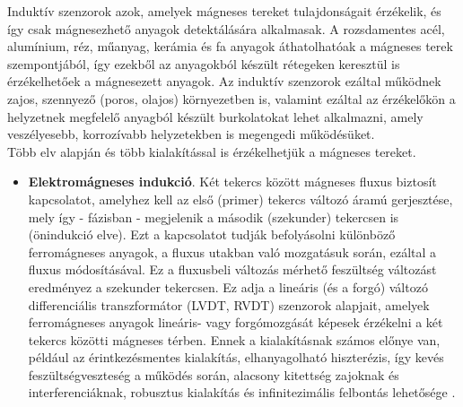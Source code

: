 Induktív szenzorok azok, amelyek mágneses tereket tulajdonságait érzékelik, és így csak mágnesezhető anyagok detektálására alkalmasak. A rozsdamentes acél, alumínium, réz, műanyag, kerámia és fa anyagok áthatolhatóak a mágneses terek szempontjából, így ezekből az anyagokból készült rétegeken keresztül is érzékelhetőek a mágnesezett anyagok. Az induktív szenzorok ezáltal működnek zajos, szennyező (poros, olajos) környezetben is, valamint ezáltal az érzékelőkön a helyzetnek megfelelő anyagból készült burkolatokat lehet alkalmazni, amely veszélyesebb, korrozívabb helyzetekben is megengedi működésüket.\\
Több elv alapján és több kialakítással is érzékelhetjük a mágneses tereket.
\begin{itemize}
	\item \textbf{Elektromágneses indukció}. Két tekercs között mágneses fluxus biztosít kapcsolatot, amelyhez kell az első (primer) tekercs változó áramú gerjesztése, mely így - fázisban - megjelenik a második (szekunder) tekercsen is (önindukció elve). Ezt a kapcsolatot tudják befolyásolni különböző ferromágneses anyagok, a fluxus utakban való mozgatásuk során, ezáltal a fluxus módosításával. Ez a fluxusbeli változás mérhető feszültség változást eredményez a szekunder tekercsen. Ez adja a lineáris (és a forgó) változó differenciális transzformátor (LVDT, RVDT) szenzorok alapjait, amelyek ferromágneses anyagok lineáris- vagy forgómozgását képesek érzékelni a két tekercs közötti mágneses térben. Ennek a kialakításnak számos előnye van, például az érintkezésmentes kialakítás, elhanyagolható hiszterézis, így kevés feszültségveszteség a működés során, alacsony kitettség zajoknak és interferenciáknak, robusztus kialakítás és infinitezimális felbontás lehetősége \cite{Fraden2016a}.

\end{itemize}
